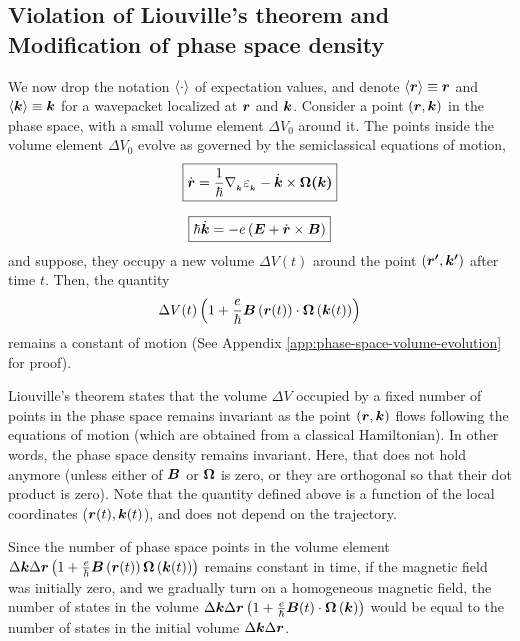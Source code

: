 \documentclass{report}
\renewcommand\vec[1]{\ensuremath\boldsymbol{#1}} %
\begin{document}
\subsection{Violation of Liouville's theorem and Modification of phase space density}
We now drop the notation $\expval{\cdot}$ of expectation values, and denote $\expval{\vec{r}} \equiv \vec{r}$ and $\expval{\vec{k}} \equiv \vec{k}$ for a wavepacket localized at $\vec{r}$ and $\vec{k}$. Consider a point $\left(\vec{r},\vec{k}\right)$ in the phase space, with a small volume element $\Delta V_0$ around it. The points inside the volume element $\Delta V_0$ evolve as governed by the semiclassical equations of motion,
\begin{equation}\label{Eq:evolution-of-R}
	\boxed{\dot{\vec{r}} = \frac{1}{\hbar} \nabla{_{_{\vec{k}}}} \varepsilon_{_{\vec{k}}} - \dot{\vec{k}} \times \vec{\Omega(\vec{k})}}
\end{equation}

\begin{equation}\label{Eq:evolution-of-K}
	\boxed{\hbar \dot{\vec{k}} = -e\left(\vec{E} + \dot{\vec{r}} \times \vec{B} \right)}
\end{equation}
and suppose, they occupy a new volume $\Delta V(t)$ around the point $\left(\vec{r'},\vec{k'}\right)$ after time $t$. Then, the quantity $$\Delta V(t) \left(1 + \frac{e}{\hbar} \vec{B}\left(\vec{r}(t)\right) \cdot  \vec{\Omega}\left(\vec{k}(t)\right)\right)$$ remains a constant of motion \cite{BerryCorrectionPhaseSpaceNiu2005}(See Appendix \ref{app:phase-space-volume-evolution} for proof).

Liouville's theorem states that the volume $\Delta V$ occupied by a fixed number of points in the phase space remains invariant as the point $\left(\vec{r},\vec{k}\right)$ flows following the equations of motion (which are obtained from a classical Hamiltonian). In other words, the phase space density remains invariant. Here, that does not hold anymore (unless either of $\vec{B}$ or $\vec{\Omega}$ is zero, or they are orthogonal so that their dot product is zero). Note that the quantity defined above is a function of the local coordinates ($\vec{r}(t), \vec{k}(t)$), and does not depend on the trajectory.

Since the number of phase space points in the volume element $\Delta \vec{k} \Delta \vec{r} \left(1 + \frac{e}{\hbar} \vec{B}\left(\vec{r}(t)\right) \vec{\Omega}\left(\vec{k}(t)\right)\right)$ remains constant in time, if the magnetic field was initially zero, and we gradually turn on a homogeneous magnetic field, the number of states in the volume $\Delta \vec{k} \Delta \vec{r} \left(1 + \frac{e}{\hbar} \vec{B}(t) \cdot \vec{\Omega}\left(\vec{k}\right)\right)$ would be equal to the number of states in the initial volume $\Delta \vec{k} \Delta \vec{r}$.
\end{document}
